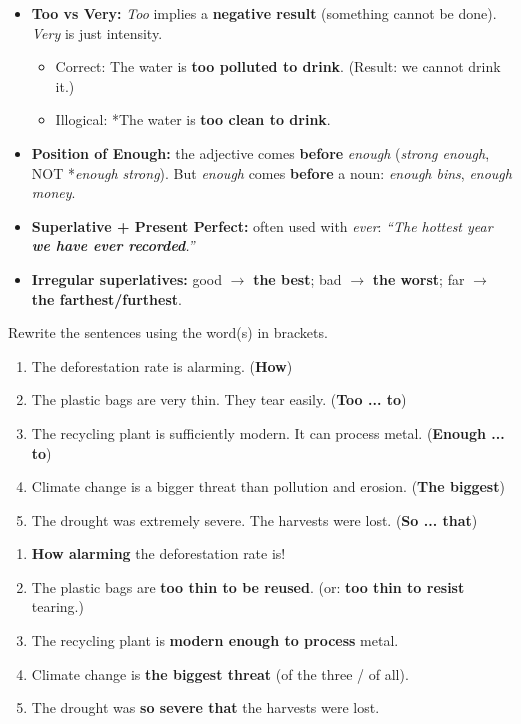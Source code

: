 \documentclass[11pt]{article}
\begin{document}
\begin{attention}
\begin{itemize}
    \item \textbf{Too vs Very:} \emph{Too} implies a \textbf{negative result} (something cannot be done). \emph{Very} is just intensity.
    \begin{itemize}
        \item Correct: The water is \textbf{too polluted to drink}. (Result: we cannot drink it.)
        \item Illogical: *The water is \textbf{too clean to drink}.
    \end{itemize}
    \item \textbf{Position of Enough:} the adjective comes \textbf{before} \emph{enough} (\emph{strong enough}, NOT *\emph{enough strong}). But \emph{enough} comes \textbf{before} a noun: \emph{enough bins}, \emph{enough money}.
    \item \textbf{Superlative + Present Perfect:} often used with \emph{ever}: \textit{``The hottest year \textbf{we have ever recorded}.''}
    \item \textbf{Irregular superlatives:} good $\rightarrow$ \textbf{the best}; bad $\rightarrow$ \textbf{the worst}; far $\rightarrow$ \textbf{the farthest/furthest}.
\end{itemize}
\end{attention}

\begin{exercice}
Rewrite the sentences using the word(s) in brackets.
\begin{enumerate}
    \item The deforestation rate is alarming. (\textbf{How})
    \item The plastic bags are very thin. They tear easily. (\textbf{Too ... to})
    \item The recycling plant is sufficiently modern. It can process metal. (\textbf{Enough ... to})
    \item Climate change is a bigger threat than pollution and erosion. (\textbf{The biggest})
    \item The drought was extremely severe. The harvests were lost. (\textbf{So ... that})
\end{enumerate}
\end{exercice}

\begin{corrige}
\begin{enumerate}
    \item \textbf{How alarming} the deforestation rate is!
    \item The plastic bags are \textbf{too thin to be reused}. (or: \textbf{too thin to resist} tearing.)
    \item The recycling plant is \textbf{modern enough to process} metal.
    \item Climate change is \textbf{the biggest threat} (of the three / of all).
    \item The drought was \textbf{so severe that} the harvests were lost.
\end{enumerate}
\end{corrige}
\end{document}
